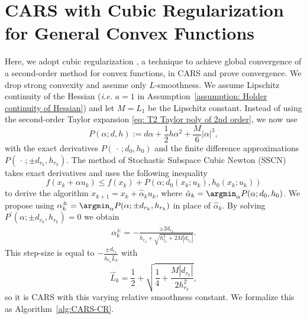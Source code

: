 \section{CARS with Cubic Regularization for General Convex Functions}
\label{section:CARS_CR}
Here, we adopt cubic regularization \cite{nesterov2006cubic, pmlr-v119-hanzely20a}, a technique to achieve global convergence of a second-order method for convex functions, in CARS and prove convergence.
We drop strong convexity and assume only $L$-smoothness. We assume Lipschitz continuity of the Hessian (\emph{i.e.} $a=1$ in Assumption~\ref{assumption: Holder continuity of Hessian}) and let $M = L_1$ be the Lipschitz constant.
Instead of using the second-order Taylor expansion \eqref{eq: T2 Taylor poly of 2nd order}, we now use
\begin{equation}
    P(\alpha; d, h) := d\alpha + \frac{1}{2}h\alpha^2 + \frac{M}{6}|\alpha|^3,
\end{equation}
with the exact derivatives $P(\,\cdot\,; d_0, h_0)$ and the finite difference approximations $P(\,\cdot\,; \pm d_{r_k}, h_{r_k})$.
The method of Stochastic Subspace Cubic Newton (SSCN) \cite{pmlr-v119-hanzely20a} takes exact derivatives and uses the following inequality  \cite[Lemma~2.3]{pmlr-v119-hanzely20a}
\begin{equation}\label{eq: cubic regularization bound}
    f(x_{k} + \alpha u_k) \leq f(x_k) + P(\alpha; d_0(x_k; u_k), h_0(x_k; u_k))
\end{equation}
to derive the algorithm $x_{k+1} = x_k + \hat{\alpha}_{k} u_k$, where $\hat{\alpha}_{k} = \argmin_{\alpha} P(\alpha; d_0, h_0)$. We propose using $\alpha_{k}^{\pm} = \argmin_{\alpha}P(\alpha; \pm d_{r_k}, h_{r_k})$ in place of $\hat{\alpha}_k$. By solving $P^{\prime}(\alpha; \pm d_{r_k}, h_{r_k}) = 0$ we obtain
\begin{align*}
    \alpha_k^{\pm} = -\frac{\pm 2d_{r_k}}{h_{r_k} + \sqrt{h_{r_k}^2 + 2M|d_{r_k}|}}.
\end{align*}
This step-size is equal to $-\frac{\pm d_{r_k}}{h_{r_k}\hat{L}_k}$ with
\begin{equation} \label{eq: L_k for CARS-CR}
    \hat{L}_k = \frac{1}{2} +\sqrt{\frac{1}{4} + \frac{M|d_{r_k}|}{2h_{r_k}^2}},
\end{equation}
so it is CARS with this varying relative smoothness constant.
We formalize this as Algorithm~\ref{alg:CARS-CR}.


